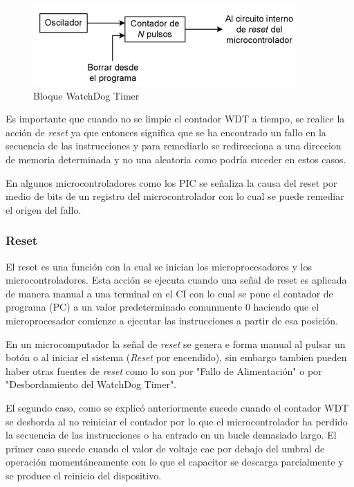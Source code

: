 \documentclass[letterpaper,12pt,oneside]{book}
\begin{document}
				\begin{figure}[!htpb]
					\centering
					\includegraphics[scale = 1.0]{Material de Consulta/BloqWDT.PNG}
					\caption[Bloque WatchDog Timer]{Bloque WatchDog Timer}
					\label{BloqWDT}
				\end{figure}

				Es importante que cuando no se limpie el contador WDT a tiempo, se realice la acción de \textit{reset} ya que entonces significa que se ha encontrado un fallo en la secuencia de las instrucciones y para remediarlo se redirecciona a una direccion de memoria determinada y no una aleatoria como podría suceder en estos casos.

				En algunos microcontroladores como los PIC se señaliza la causa del reset por medio de bits de un registro del microcontrolador con lo cual se puede remediar el origen del fallo.

				\subsubsection{Reset}
				El reset es una función con la cual se inician los microprocesadores y los microcontroladores. Esta acción se ejecuta cuando una señal de reset es aplicada de manera manual a una terminal en el CI con lo cual se pone el contador de programa (PC) a un valor predeterminado comunmente 0 haciendo que el microprocesador comienze a ejecutar las instrucciones a partir de esa posición.

				En un microcomputador la señal de \textit{reset} se genera e forma manual al pulsar un botón o al iniciar el sistema (\textit{Reset} por encendido), sin embargo tambien pueden haber otras fuentes de \textit{reset} como lo son por "Fallo de Alimentación" o por "Desbordamiento del WatchDog Timer".

				El segundo caso, como se explicó anteriormente sucede cuando el contador WDT se desborda al no reiniciar el contador por lo que el microcontrolador ha perdido la secuencia de las instrucciones o ha entrado en un bucle demasiado largo. El primer caso sucede cuando el valor de voltaje cae por debajo del umbral de operación momentáneamente con lo que el capacitor se descarga parcialmente y se produce el reinicio del dispositivo.
\end{document}
